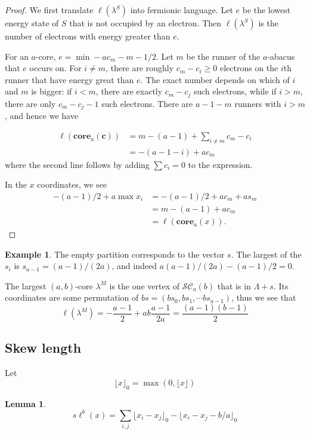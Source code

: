 \documentclass{amsart}[12pt]
\theoremstyle{definition}
\newtheorem{lemma}[dummy]{Lemma}
\newtheorem{example}[dummy]{Example}
\newcommand{\core}{\mathbf{core}}
\newcommand{\SC}{\mathcal{SC}}
\newcommand{\sk}{s\ell}
\begin{document}
\begin{proof}
We first translate $\ell(\lambda^S)$ into fermionic language.
Let $e$ be the lowest energy state of $S$ that is not occupied by an electron.  Then $\ell(\lambda^S)$ is the number of electrons with energy greater than $e$.

For an $a$-core, $e=\min -ac_m-m-1/2$.  Let $m$ be the runner of the $a$-abacus that $e$ occurs on. For $i\neq m$, there are roughly $c_m-c_i\geq 0 $ electrons on the $i$th runner that have energy great than $e$.  The exact number depends  on which of $i$ and $m$ is bigger: if $i<m$, there are exactly $c_m-c_j$ such electrons, while if $i>m$, there are only $c_m-c_j-1$ such electrons.  There are $a-1-m$ runners with $i>m$, and hence we have

\begin{align*}
\ell(\core_a(\mathbf{c})) & =m-(a-1)+\sum_{i\neq m} c_m-c_i \\
 &=-(a-1-i)+ac_m
 \end{align*}
 where the second line follows by adding $\sum c_i=0$ to the expression.

In the $x$ coordinates, we see
\begin{align*}
-(a-1)/2+a\max x_i&=-(a-1)/2+ac_m+as_m\\
&=m-(a-1)+ac_m\\
&=\ell(\core_a(x)).
\end{align*}

\end{proof}



\begin{example}
The empty partition corresponds to the vector $s$.  The largest of the
$s_i$ is $s_{a-1}=(a-1)/(2a)$, and indeed $a(a-1)/(2a)-(a-1)/2=0$.

The largest $(a,b)$-core $\lambda^M$ is the one vertex of $\SC_a(b)$ that is in $\Lambda+s$.  Its coordinates are some permutation of
$bs=(bs_0,bs_1,\cdots bs_{a-1})$, thus we see that
$$\ell(\lambda^M)=-\frac{a-1}{2}+ab\frac{a-1}{2a}=\frac{(a-1)(b-1)}{2}$$

\end{example}


\subsection{Skew length}

Let 
$$\lfloor x \rfloor_0=\max \left(0, \lfloor x \rfloor\right)$$

\begin{lemma}
$$\sk^b(x)=\sum_{i,j}\lfloor x_i-x_j\rfloor_0-\lfloor x_i-x_j-b/a\rfloor_0$$

\end{lemma}
\end{document}
